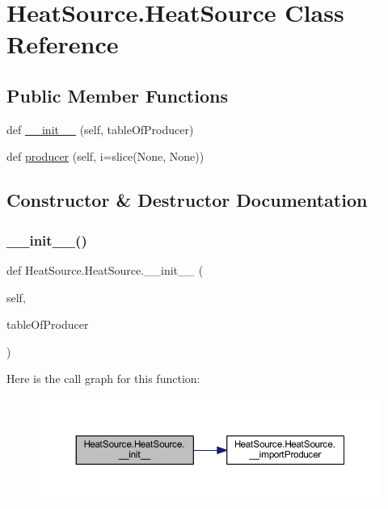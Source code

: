 \hypertarget{class_heat_source_1_1_heat_source}{}\section{Heat\+Source.\+Heat\+Source Class Reference}
\label{class_heat_source_1_1_heat_source}
\subsection*{Public Member Functions}
\begin{DoxyCompactItemize}
\item 
def \hyperlink{class_heat_source_1_1_heat_source_a0aa3ba858e7b64f2a0a3a27d91714097}{\+\_\+\+\_\+init\+\_\+\+\_\+} (self, table\+Of\+Producer)
\item 
def \hyperlink{class_heat_source_1_1_heat_source_a2c86ea2252b3a4f0eec9428fc61e14ab}{producer} (self, i=slice(None, None))
\end{DoxyCompactItemize}


\subsection{Constructor \& Destructor Documentation}
\mbox{\label{class_heat_source_1_1_heat_source_a0aa3ba858e7b64f2a0a3a27d91714097}} 
\subsubsection{\texorpdfstring{\+\_\+\+\_\+init\+\_\+\+\_\+()}{\_\_init\_\_()}}
{\footnotesize\ttfamily def Heat\+Source.\+Heat\+Source.\+\_\+\+\_\+init\+\_\+\+\_\+ (\begin{DoxyParamCaption}\item[{}]{self,  }\item[{}]{table\+Of\+Producer }\end{DoxyParamCaption})}

Here is the call graph for this function\+:
\nopagebreak
\begin{figure}[H]
\begin{center}
\leavevmode
\includegraphics[width=350pt]{class_heat_source_1_1_heat_source_a0aa3ba858e7b64f2a0a3a27d91714097_cgraph}
\end{center}
\end{figure}


